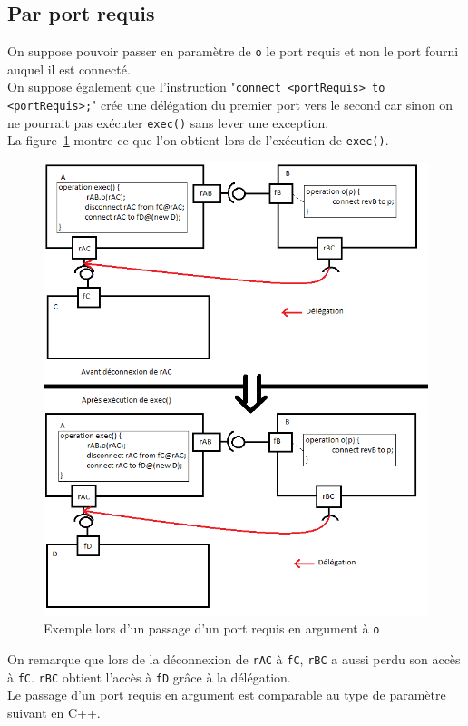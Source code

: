 \documentclass[11pt,a4paper,openany,oneside]{book}
\begin{document}
\subsection{Par port requis}

\label{passageRequis}
On suppose pouvoir passer en paramètre de \texttt{o} le port requis et non le port fourni auquel il est connecté. \\
On suppose également que l'instruction "\texttt{connect <portRequis> to <portRequis>;}" crée une délégation du premier port vers le second car sinon on ne pourrait pas exécuter \texttt{exec()} sans lever une exception.\\
La figure~\ref{exempleRequis} montre ce que l'on obtient lors de l'exécution de \texttt{exec()}.
\begin{figure}[H]
\centering
\includegraphics[scale=0.7, keepaspectratio=true]{exempleRequis.png}
\caption{Exemple lors d'un passage d'un port requis en argument à \texttt{o}}
\label{exempleRequis}
\end{figure}
On remarque que lors de la déconnexion de \texttt{rAC} à \texttt{fC}, \texttt{rBC} a aussi perdu son accès à \texttt{fC}. \texttt{rBC} obtient l'accès à \texttt{fD} grâce à la délégation.\\
Le passage d'un port requis en argument est comparable au type de paramètre suivant en C++.
\end{document}
